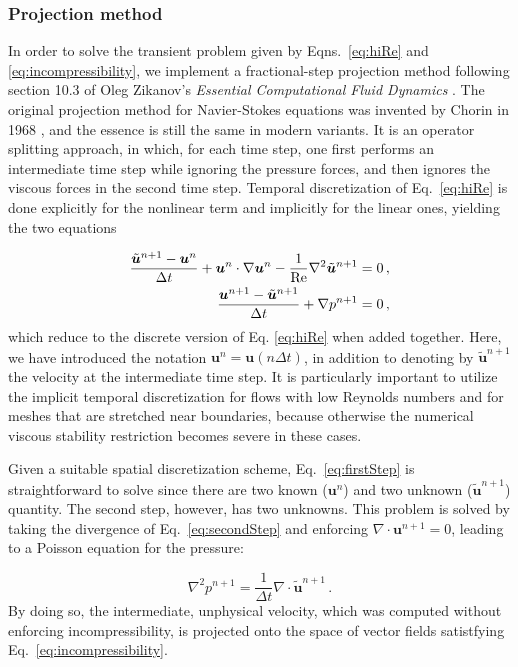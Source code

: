 \documentclass[final,3p,twocolumn]{elsarticle}
\begin{document}
\subsubsection{Projection method}

In order to solve the transient problem given by Eqns.\ \eqref{eq:hiRe} and
\eqref{eq:incompressibility}, we implement a fractional-step projection method
following section 10.3 of Oleg Zikanov's {\em Essential Computational Fluid
Dynamics} \cite{zikanov2010essential}. The original projection method for
Navier-Stokes equations was invented by Chorin in 1968
\cite{chorin1968numerical}, and the essence is still the same in modern
variants. It is an operator splitting approach, in which, for each time step,
one first performs an intermediate time step while ignoring the pressure
forces, and then ignores the viscous forces in the second time step.
Temporal discretization of Eq. \eqref{eq:hiRe} is done explicitly for the
nonlinear term and implicitly for the linear ones, yielding the two equations 

\begin{align}
    \label{eq:firstStep}
    \frac{\tilde{\bm{u}}^{n+1} - \bm{u}^n}{\Delta t} + \bm{u}^n \cdot \nabla
    \bm{u}^n - \frac{1}{\rm Re} \nabla^2 \tilde{\bm{u}}^{n+1} &= 0 \,, \\
    \label{eq:secondStep}
    \frac{\bm{u}^{n+1} - \tilde{\bm{u}}^{n+1}}{\Delta t} + \nabla p^{n+1} &= 0
    \,,
\end{align}
%
which reduce to the discrete version of Eq. \eqref{eq:hiRe} when added
together. Here, we have introduced the notation $\bm{u}^n = \bm{u}(n \Delta
t)$, in addition to denoting by $\tilde{\bm{u}}^{n+1}$ the velocity at the
intermediate time step.  It is particularly important to utilize the implicit
temporal discretization for flows with low Reynolds numbers and for meshes that
are stretched near boundaries, because otherwise the numerical viscous stability
restriction becomes severe in these cases. 

Given a suitable spatial discretization scheme, Eq.\ \eqref{eq:firstStep} is
straightforward to solve since there are two known ($\bm{u}^n$) and two unknown
($\tilde{\bm{u}}^{n+1}$) quantity. The second step, however, has two unknowns.
This problem is solved by taking the divergence of Eq. \eqref{eq:secondStep}
and enforcing $\nabla \cdot \bm{u}^{n+1} = 0$, leading to a Poisson equation
for the pressure:

\begin{equation} 
    \nabla^2 p^{n+1} = \frac{1}{\Delta t} \nabla \cdot \tilde{\bm{u}}^{n+1} \,.
    \label{eq:poissonPressure}
\end{equation}
%
By doing so, the intermediate, unphysical velocity, which was computed without
enforcing incompressibility, is projected onto the space of vector fields
satistfying Eq.\ \eqref{eq:incompressibility}. 
\end{document}
